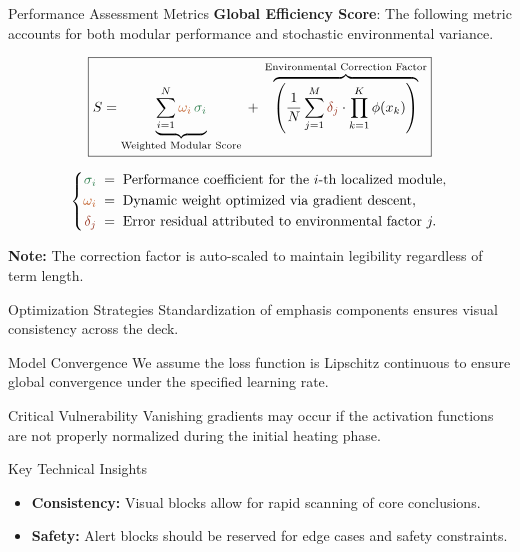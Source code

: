 \begin{frame}{Performance Assessment Metrics}
  \textbf{Global Efficiency Score}: The following metric accounts for both modular performance and stochastic environmental variance.

  \[
    \boxed{
      S = \underbrace{\sum_{i=1}^{N} \textcolor{myorange}{\omega_i}\, \textcolor{mygreen}{\sigma_i}}_{\text{Weighted Modular Score}} \;+\;
      \overbrace{\left( {\frac{1}{N} \sum_{j=1}^{M} \textcolor{myred}{\delta_j} \cdot \prod_{k=1}^{K} \phi(x_k)} \right)}^{\text{Environmental Correction Factor}}
    }
  \]

  \[
    \left\{
    \begin{aligned}
      \textcolor{mygreen}{\sigma_i} &\;=\; \text{Performance coefficient for the } i\text{-th localized module}, \\
      \textcolor{myorange}{\omega_i} &\;=\; \text{Dynamic weight optimized via gradient descent}, \\
      \textcolor{myred}{\delta_j} &\;=\; \text{Error residual attributed to environmental factor } j.
    \end{aligned}
    \right.
  \]

  \vspace{0.5em}
  \small \textbf{Note:} The correction factor is auto-scaled to maintain legibility regardless of term length.
\end{frame}

\begin{frame}{Optimization Strategies}
  Standardization of emphasis components ensures visual consistency across the deck.

  \begin{block}{Model Convergence}
    We assume the loss function is Lipschitz continuous to ensure global convergence under the specified learning rate.
  \end{block}

  \begin{alertblock}{Critical Vulnerability}
    Vanishing gradients may occur if the activation functions are not properly normalized during the initial heating phase.
  \end{alertblock}

  \begin{exampleblock}{Key Technical Insights}
    \begin{itemize}
        \item \textbf{Consistency:} Visual blocks allow for rapid scanning of core conclusions.
        \item \textbf{Safety:} Alert blocks should be reserved for edge cases and safety constraints.
    \end{itemize}
  \end{exampleblock}
\end{frame}


